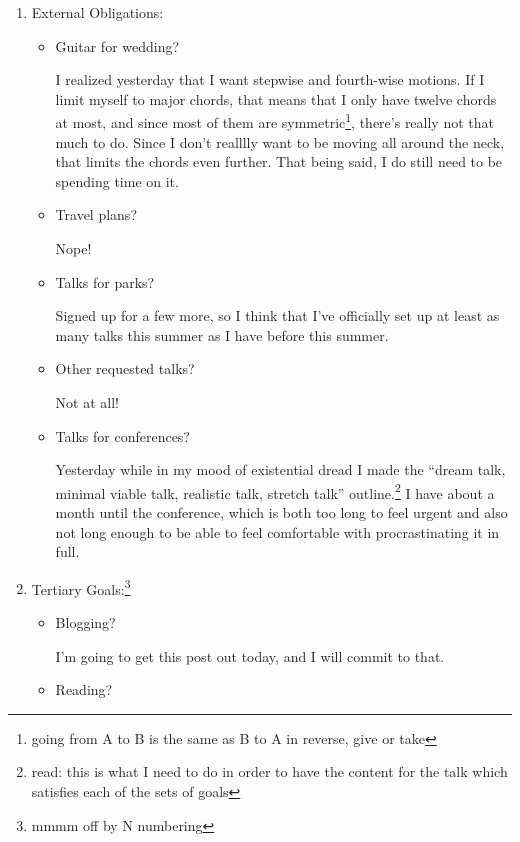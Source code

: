 \documentclass[12pt]{article}
\newcommand{\say}[1]{``#1''}
\renewcommand{\,}{\textsuperscript{,}}
\begin{document}
\begin{enumerate}
\item External Obligations:

\begin{itemize}

\item Guitar for wedding?

I realized yesterday that I want stepwise and fourth-wise motions.  
If I limit myself to major chords, that means that I only have twelve chords at most, and since most of them are symmetric\footnote{going from A to B is the same as B to A in reverse, give or take}, there's really not that much to do.  
Since I don't realllly want to be moving all around the neck, that limits the chords even further.  
That being said, I do still need to be spending time on it.

\item Travel plans?

Nope!

\item Talks for parks?

Signed up for a few more, so I think that I've officially set up at least as many talks this summer as I have before this summer.

\item Other requested talks?

Not at all!

\item Talks for conferences?

Yesterday while in my mood of existential dread I made the \say{dream talk, minimal viable talk, realistic talk, stretch talk} outline.\footnote{read: this is what I need to do in order to have the content for the talk which satisfies each of the sets of goals}  
I have about a month until the conference, which is both too long to feel urgent and also not long enough to be able to feel comfortable with procrastinating it in full.

\end{itemize}

\item Tertiary Goals:\footnote{mmmm off by N numbering}

\begin{itemize}

\item Blogging?

I'm going to get this post out today, and I will commit to that.

\item Reading?


\end{itemize}
\end{enumerate}
\end{document}
